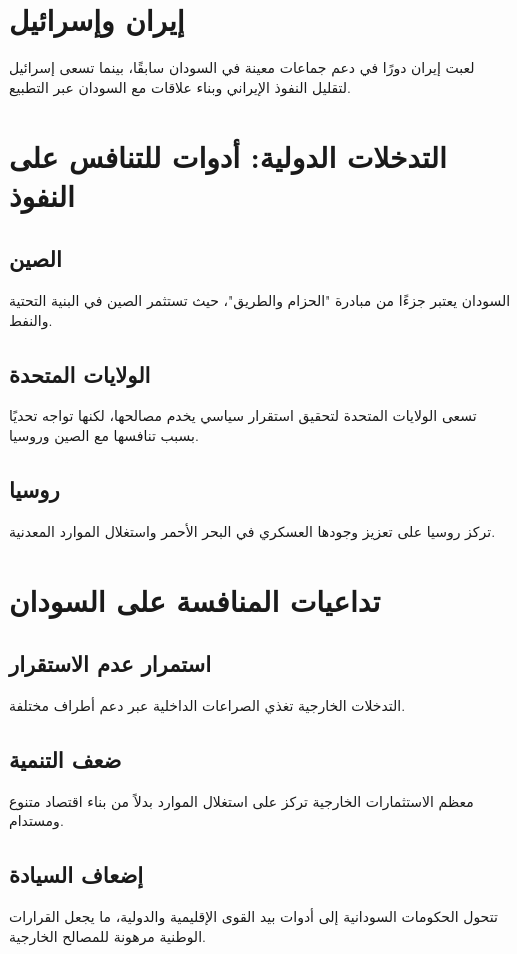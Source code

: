 \documentclass[12pt]{article}
\begin{document}
\section{إيران وإسرائيل}
لعبت إيران دورًا في دعم جماعات معينة في السودان سابقًا، بينما تسعى إسرائيل لتقليل النفوذ الإيراني وبناء علاقات مع السودان عبر التطبيع.

\section{التدخلات الدولية: أدوات للتنافس على النفوذ}
\subsection{الصين}
السودان يعتبر جزءًا من مبادرة "الحزام والطريق"، حيث تستثمر الصين في البنية التحتية والنفط.

\subsection{الولايات المتحدة}
تسعى الولايات المتحدة لتحقيق استقرار سياسي يخدم مصالحها، لكنها تواجه تحديًا بسبب تنافسها مع الصين وروسيا.

\subsection{روسيا}
تركز روسيا على تعزيز وجودها العسكري في البحر الأحمر واستغلال الموارد المعدنية.

\section{تداعيات المنافسة على السودان}
\subsection{استمرار عدم الاستقرار}
التدخلات الخارجية تغذي الصراعات الداخلية عبر دعم أطراف مختلفة.

\subsection{ضعف التنمية}
معظم الاستثمارات الخارجية تركز على استغلال الموارد بدلاً من بناء اقتصاد متنوع ومستدام.

\subsection{إضعاف السيادة}
تتحول الحكومات السودانية إلى أدوات بيد القوى الإقليمية والدولية، ما يجعل القرارات الوطنية مرهونة للمصالح الخارجية.
\end{document}
